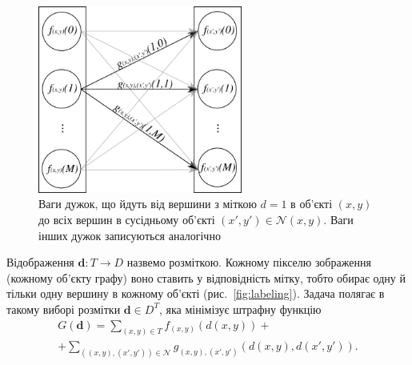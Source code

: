 \begin{figure}[h]
  \centering
  \includegraphics[width=0.6\textwidth]{images/neighbor_edge_weights}
  \caption{Ваги дужок, що йдуть від вершини з міткою $d = 1$ в об'єкті
           $\left(x, y \right)$ до всіх вершин в сусідньому об'єкті
           $\left(x', y' \right) \in \mathcal{N}\left(x, y \right)$.
           Ваги інших дужок записуються аналогічно}
  \label{fig:neighbor:edge:weights}
\end{figure}

Відображення $\pmb{d} : T \rightarrow D$ назвемо розміткою.
Кожному пікселю зображення (кожному об'єкту графу)
воно ставить у відповідність мітку,
тобто обирає одну й тільки одну вершину в кожному об'єкті
(рис.~\ref{fig:labeling}).
Задача полягає в такому виборі розмітки $\pmb{d} \in D^T$,
яка мінімізує штрафну функцію
\begin{equation} \label{eq:overview:penalty}
\begin{gathered}
    G \left( \pmb{d} \right)
    = \sum \limits_{\left(x, y \right) \in T}
        f_{\left(x, y \right)} \left(d \left(x, y \right) \right) + \\
    + \sum \limits_{\left(\left(x, y \right), \left(x', y'\right) \right) \in \mathcal{N}}
        g_{\left(x, y \right), \left(x', y' \right)} \left(
            d \left( x, y \right), d \left( x', y' \right)
        \right).
\end{gathered}
\end{equation}

